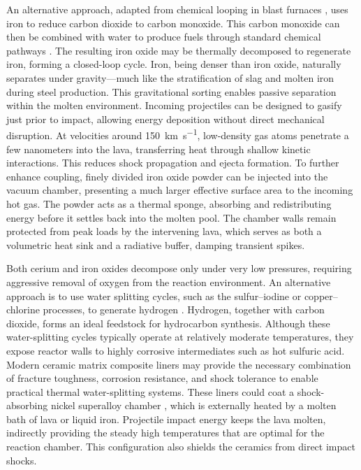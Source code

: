 \documentclass{article}
\begin{document}
An alternative approach, adapted from chemical looping in blast furnaces \cite{iron_chemical_looping}, uses iron to reduce carbon dioxide to carbon monoxide. This carbon monoxide can then be combined with water to produce fuels through standard chemical pathways \cite{fischer_tropsch}. The resulting iron oxide may be thermally decomposed to regenerate iron, forming a closed-loop cycle. Iron, being denser than iron oxide, naturally separates under gravity---much like the stratification of slag and molten iron during steel production. This gravitational sorting enables passive separation within the molten environment. Incoming projectiles can be designed to gasify just prior to impact, allowing energy deposition without direct mechanical disruption. At velocities around \SI{150}{\kilo\meter\per\second}, low-density gas atoms penetrate a few nanometers into the lava, transferring heat through shallow kinetic interactions. This reduces shock propagation and ejecta formation. To further enhance coupling, finely divided iron oxide powder can be injected into the vacuum chamber, presenting a much larger effective surface area to the incoming hot gas. The powder acts as a thermal sponge, absorbing and redistributing energy before it settles back into the molten pool. The chamber walls remain protected from peak loads by the intervening lava, which serves as both a volumetric heat sink and a radiative buffer, damping transient spikes.

Both cerium and iron oxides decompose only under very low pressures, requiring aggressive removal of oxygen from the reaction environment. An alternative approach is to use water splitting  cycles, such as the sulfur–iodine or copper–chlorine processes, to generate hydrogen \cite{sulfur_iodine_chlorine}. Hydrogen, together with carbon dioxide, forms an ideal feedstock for hydrocarbon synthesis. Although these water-splitting cycles typically operate at relatively moderate temperatures, they expose reactor walls to highly corrosive intermediates such as hot sulfuric acid. Modern ceramic matrix composite liners \cite{flexible_ceramic_composites} may provide the necessary combination of fracture toughness, corrosion resistance, and shock tolerance to enable practical thermal water-splitting systems.  These liners could coat a shock-absorbing nickel superalloy chamber \cite{inconel_718_strong}, which is externally heated by a molten bath of lava or liquid iron.  Projectile impact energy keeps the lava molten, indirectly providing the steady high temperatures that are optimal for the reaction chamber. This configuration also shields the ceramics from direct impact shocks. 
\end{document}
